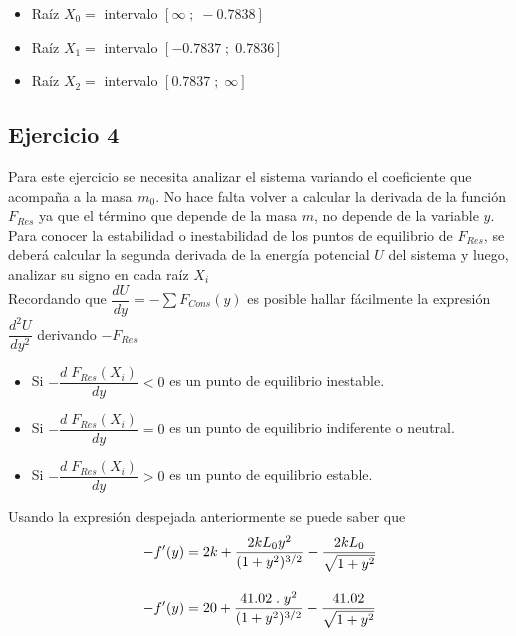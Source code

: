 \documentclass[10pt,a4paper]{article}
\begin{document}
\begin{itemize}
    \item Raíz $X_{0}=$ intervalo $[\infty\; ;\;-0.7838]$
    \item Raíz $X_{1}=$ intervalo $[-0.7837\;;\;0.7836]$
    \item Raíz $X_{2}=$ intervalo $[0.7837\;;\;\infty]$\\
\end{itemize}
 
\subsection{Ejercicio 4}

Para este ejercicio se necesita analizar el sistema variando el coeficiente que acompaña a la masa $m_0$. No hace falta volver a calcular la derivada de la función $F_{Res}$ ya que el término que depende de la masa $m$, no depende de la variable $y$.\\

Para conocer la estabilidad o inestabilidad de los puntos de equilibrio de $F_{Res}$, se deberá calcular la segunda derivada de la energía potencial $U$ del sistema y luego, analizar su signo en cada raíz $X_{i}$\\


Recordando que $\dfrac{dU}{dy}=-\sum{F_{Cons}} (y)$ es posible hallar fácilmente la expresión $\dfrac{d^{2}U}{dy^{2}}$ derivando  $-F_{Res}$\\

\begin{itemize}
    \item Si $-\dfrac{d\;F_{Res}(X_{i})}{dy} < 0 $ es un punto de equilibrio inestable.
    \item Si $-\dfrac{d\;F_{Res}(X_{i})}{dy} = 0 $ es un punto de equilibrio indiferente o neutral.
    \item Si $-\dfrac{d\;F_{Res}(X_{i})}{dy} > 0 $ es un punto de equilibrio estable.
\end{itemize}

Usando la expresión despejada anteriormente se puede saber que \\

\begin{equation}
\begin{aligned}
\notag - f'(y)&=2k+\dfrac{2kL_{0}y^{2}}{(1 + y^{2})^{3/2}} - \dfrac{2kL_{0}}{\sqrt{1 + y^{2}}}\\[10pt]
- f'(y)&=20+\dfrac{41.02\;.\;y^{2}}{(1 + y^{2})^{3/2}} - \dfrac{41.02}{\sqrt{1 + y^{2}}}
 \end{aligned}
\end{equation}\\
\end{document}
